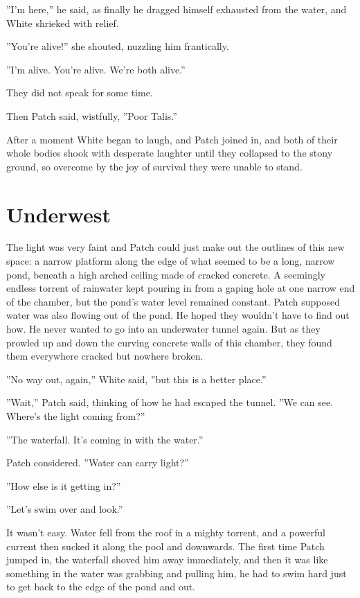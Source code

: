 \documentclass[12pt]{book}
\begin{document}
''I'm here,'' he said, as finally he dragged himself exhausted from the water, and White shrieked with relief.

''You're alive!'' she shouted, nuzzling him frantically.

''I'm alive. You're alive. We're both alive.''

They did not speak for some time.

Then Patch said, wistfully, ''Poor Talis.''

After a moment White began to laugh, and Patch joined in, and both of their whole bodies shook with desperate laughter until they collapsed to the stony ground, so overcome by the joy of survival they were unable to stand.


\section{Underwest}

The light was very faint and Patch could just make out the outlines of this new space: a narrow platform along the edge of what seemed to be a long, narrow pond, beneath a high arched ceiling made of cracked concrete. A seemingly endless torrent of rainwater kept pouring in from a gaping hole at one narrow end of the chamber, but the pond's water level remained constant. Patch supposed water was also flowing out of the pond. He hoped they wouldn't have to find out how. He never wanted to go into an underwater tunnel again. But as they prowled up and down the curving concrete walls of this chamber, they found them everywhere cracked but nowhere broken.

''No way out, again,'' White said, ''but this is a better place.''

''Wait,'' Patch said, thinking of how he had escaped the tunnel. ''We can see. Where's the light coming from?''

''The waterfall. It's coming in with the water.''

Patch considered. ''Water can carry light?''

''How else is it getting in?''

''Let's swim over and look.''

It wasn't easy. Water fell from the roof in a mighty torrent, and a powerful current then sucked it along the pool and downwards. The first time Patch jumped in, the waterfall shoved him away immediately, and then it was like something in the water was grabbing and pulling him, he had to swim hard just to get back to the edge of the pond and out.
\end{document}
